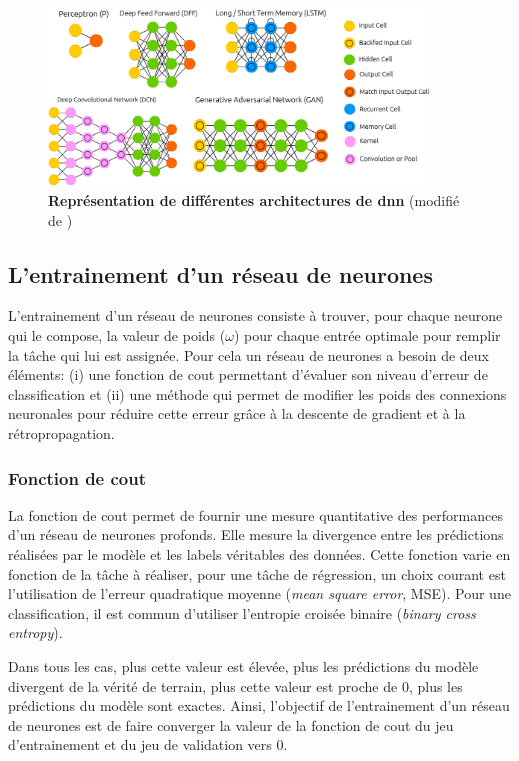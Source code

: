 \begin{figure}[!ht]
 \centering
 \includegraphics[width=0.9\textwidth]{figures/dnn_archi.png}
 \caption[Représentation de différentes architectures de \gls{dnn}]{\textbf{Représentation de différentes architectures de \gls{dnn}} (modifié de \cite{leijnen_neural_2016})}
 \label{fig:dnn_archi}
\end{figure}


\subsection{L'entrainement d'un réseau de neurones}
L'entrainement d'un réseau de neurones consiste à trouver, pour chaque neurone qui le compose, la valeur de poids ($\omega$) pour chaque entrée optimale pour remplir la tâche qui lui est assignée. Pour cela un réseau de neurones a besoin de deux éléments: (i) une fonction de cout permettant d'évaluer son niveau d'erreur de classification et (ii) une méthode qui permet de modifier les poids des connexions neuronales pour réduire cette erreur grâce à la descente de gradient et à la rétropropagation.

\subsubsection{Fonction de cout}
La fonction de cout permet de fournir une mesure quantitative des performances d'un réseau de neurones profonds. Elle mesure la divergence entre les prédictions réalisées par le modèle et les labels véritables des données. Cette fonction varie en fonction de la tâche à réaliser, pour une tâche de régression, un choix courant est l'utilisation de l'erreur quadratique moyenne (\textit{mean square error}, MSE). Pour une classification, il est commun d'utiliser l'entropie croisée binaire (\textit{binary cross entropy}). 


Dans tous les cas, plus cette valeur est élevée, plus les prédictions du modèle divergent de la vérité de terrain, plus cette valeur est proche de 0, plus les prédictions du modèle sont exactes. Ainsi, l'objectif de l'entrainement d'un réseau de neurones est de faire converger la valeur de la fonction de cout du jeu d'entrainement et du jeu de validation vers 0. 


